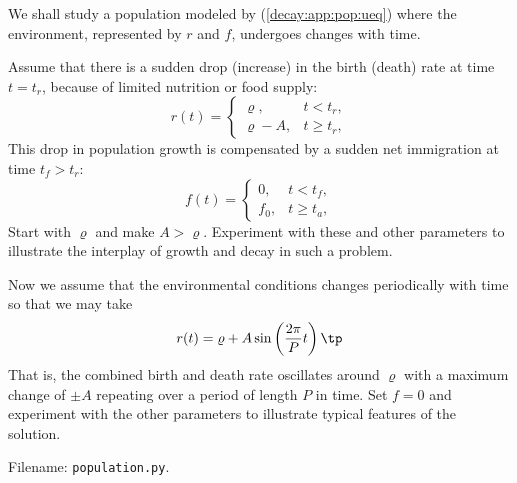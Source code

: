 \documentclass[graybox,sectrefs,envcountresetchap,open=right,final]{svmonodo}
\makeatletter
\newenvironment{doconceexercise}{}{}
\newcounter{doconceexercisecounter}%
\newcommand\listofexercises{
\chapter*{List of Exercises, Problems, and Projects
          \@mkboth{List of Exercises, Problems, and Projects}{List of Exercises, Problems, and Projects}}
\markboth{List of Exercises, Problems, and Projects}{List of Exercises, Problems, and Projects}
\@starttoc{loe}
}
\makeatother
\begin{document}
\begin{doconceexercise}

                
\label{decay:app:exer:pop:at}

We shall study a population modeled by (\ref{decay:app:pop:ueq}) where
the environment, represented by $r$ and $f$, undergoes changes with time.

Assume that there is a sudden drop (increase) in the birth (death)
rate at time $t=t_r$,
because of limited nutrition or food supply:
\[ r(t) =\left\lbrace\begin{array}{ll}
\varrho, & t < t_r,\\ 
\varrho - A, & t\geq t_r,\end{array}\right.
\]
This drop in population growth is compensated by a sudden net immigration
at time $t_f > t_r$:
\[ f(t) =\left\lbrace\begin{array}{ll}
0, & t < t_f,\\ 
f_0, & t\geq t_a,\end{array}\right.
\]
Start with $\varrho$ and make $A > \varrho$. Experiment with
these and other parameters to
illustrate the interplay of growth and decay in such a problem.


Now we assume that the environmental conditions changes periodically with
time so that we may take
\[ r(t) = {\varrho} + A\sin\left(\frac{2\pi}{P}t\right)
\tp
\]
That is, the combined birth and death rate oscillates around $\varrho$ with
a maximum change of $\pm A$ repeating over a period of length $P$ in time.
Set $f=0$ and experiment with the other parameters to illustrate typical
features of the solution.


\noindent Filename: \texttt{population.py}.

\end{doconceexercise}
\end{document}
